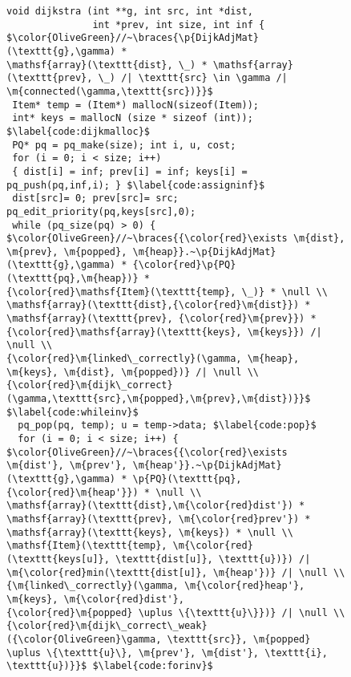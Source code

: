 
\begin{figure}[t]

\begin{lstlisting}[mathescape=true,showlines=true]
void dijkstra (int **g, int src, int *dist,
               int *prev, int size, int inf {
$\color{OliveGreen}//~\braces{\p{DijkAdjMat}(\texttt{g},\gamma) *
\mathsf{array}(\texttt{dist}, \_) * \mathsf{array}(\texttt{prev}, \_) /| \texttt{src} \in \gamma /| \m{connected(\gamma,\texttt{src})}}$
 Item* temp = (Item*) mallocN(sizeof(Item));
 int* keys = mallocN (size * sizeof (int)); $\label{code:dijkmalloc}$
 PQ* pq = pq_make(size); int i, u, cost;
 for (i = 0; i < size; i++)
 { dist[i] = inf; prev[i] = inf; keys[i] = pq_push(pq,inf,i); } $\label{code:assigninf}$
 dist[src]= 0; prev[src]= src; pq_edit_priority(pq,keys[src],0);
 while (pq_size(pq) > 0) {
$\color{OliveGreen}//~\braces{{\color{red}\exists \m{dist}, \m{prev}, \m{popped}, \m{heap}}.~\p{DijkAdjMat}(\texttt{g},\gamma) * {\color{red}\p{PQ}(\texttt{pq},\m{heap})} *
{\color{red}\mathsf{Item}(\texttt{temp}, \_)} * \null \\
\mathsf{array}(\texttt{dist},{\color{red}\m{dist}}) *
\mathsf{array}(\texttt{prev}, {\color{red}\m{prev}}) *
{\color{red}\mathsf{array}(\texttt{keys}, \m{keys}}) /| \null \\
{\color{red}\m{linked\_correctly}(\gamma, \m{heap}, \m{keys}, \m{dist}, \m{popped})} /| \null \\
{\color{red}\m{dijk\_correct}(\gamma,\texttt{src},\m{popped},\m{prev},\m{dist})}}$ $\label{code:whileinv}$
  pq_pop(pq, temp); u = temp->data; $\label{code:pop}$
  for (i = 0; i < size; i++) {
$\color{OliveGreen}//~\braces{{\color{red}\exists \m{dist'}, \m{prev'}, \m{heap'}}.~\p{DijkAdjMat}(\texttt{g},\gamma) * \p{PQ}(\texttt{pq},{\color{red}\m{heap'}}) * \null \\
\mathsf{array}(\texttt{dist},\m{\color{red}dist'}) *
\mathsf{array}(\texttt{prev}, \m{\color{red}prev'}) *
\mathsf{array}(\texttt{keys}, \m{keys}) * \null \\
\mathsf{Item}(\texttt{temp}, \m{\color{red}(\texttt{keys[u]}, \texttt{dist[u]}, \texttt{u})}) /|
\m{\color{red}min(\texttt{dist[u]}, \m{heap'})} /| \null \\
{\m{linked\_correctly}(\gamma, \m{\color{red}heap'}, \m{keys}, \m{\color{red}dist'},
{\color{red}\m{popped} \uplus \{\texttt{u}\}})} /| \null \\
{\color{red}\m{dijk\_correct\_weak}({\color{OliveGreen}\gamma, \texttt{src}}, \m{popped} \uplus \{\texttt{u}\}, \m{prev'}, \m{dist'}, \texttt{i}, \texttt{u})}}$ $\label{code:forinv}$

\end{lstlisting}
\end{figure}
